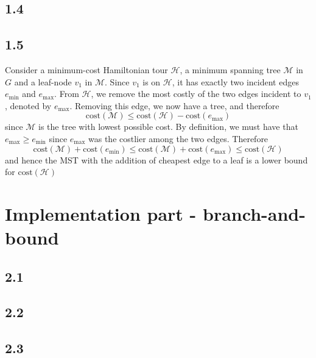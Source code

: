 \documentclass[12pt]{article}
\begin{document}
\subsection*{1.4}


\subsection*{1.5} 
Consider a minimum-cost Hamiltonian tour $\mathcal{H}$, a minimum spanning tree $\mathcal{M}$ in $G$ and a leaf-node $v_1$ in $\mathcal{M}$. Since $v_1$ is on $\mathcal{H}$, it has exactly two incident edges $e_\text{min}$ and $e_{\text{max}}$. From $\mathcal{H}$, we remove the most costly of the two edges incident to $v_1$, denoted by $e_{\max}$. Removing this edge, we now have a tree, and therefore
$$
\text{cost}(\mathcal{M}) \leq \text{cost}(\mathcal{H}) - \text{cost}(e_{\max})
$$
since $\mathcal{M}$ is the tree with lowest possible cost. By definition, we must have that $e_{\max} \geq e_\text{min}$ since $e_\text{max}$ was the costlier among the two edges. Therefore
$$
\text{cost}(\mathcal{M}) + \text{cost}(e_\text{min}) \leq \text{cost}(\mathcal{M}) + \text{cost}(e_\text{max}) \leq \text{cost}(\mathcal{H})
$$
and hence the MST with the addition of cheapest edge to a leaf is a lower bound for $\text{cost}(\mathcal{H})$

\section*{Implementation part - branch-and-bound}
\subsection*{2.1}
\subsection*{2.2}
\subsection*{2.3}
\end{document}
